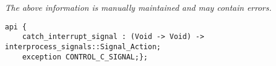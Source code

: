 \label{pkg:trap\_control\_c}

{\tiny \it The above information is manually maintained and may contain errors.}
\begin{verbatim}
api {
    catch_interrupt_signal : (Void -> Void) -> interprocess_signals::Signal_Action;
    exception CONTROL_C_SIGNAL;};
\end{verbatim}
